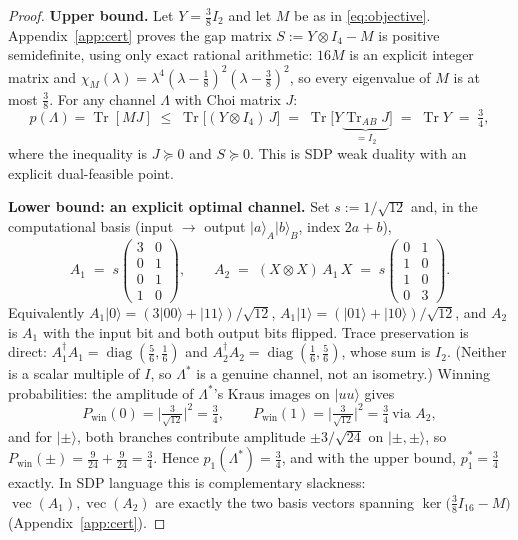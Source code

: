 \documentclass[11pt]{article}
\theoremstyle{definition}
\newcommand{\tr}{\operatorname{Tr}}
\begin{document}
\begin{proof}
\textbf{Upper bound.}  Let $Y = \tfrac38 I_2$ and let $M$ be as in
\eqref{eq:objective}.  Appendix~\ref{app:cert} proves the gap matrix
$S := Y \otimes I_4 - M$ is positive semidefinite, using only exact rational
arithmetic: $16M$ is an explicit integer matrix and $\chi_M(\lambda) =
\lambda^4 (\lambda - \tfrac18)^2 (\lambda - \tfrac38)^2$, so every eigenvalue of
$M$ is at most $\tfrac38$.  For any channel $\Lambda$ with Choi matrix $J$:
\[
  p(\Lambda) = \tr[MJ] \;\le\; \tr\big[(Y \otimes I_4)\, J\big]
  \;=\; \tr\big[Y \underbrace{\tr_{AB} J}_{= I_2}\big] \;=\; \tr Y \;=\; \tfrac34 ,
\]
where the inequality is $J \succeq 0$ and $S \succeq 0$.  This is SDP weak
duality with an explicit dual-feasible point.

\textbf{Lower bound: an explicit optimal channel.}  Set $s := 1/\sqrt{12}$ and,
in the computational basis (input $\to$ output $\lvert a\rangle_A\lvert b\rangle_B$,
index $2a + b$),
\[
A_1 \;=\; s \begin{pmatrix} 3&0\\ 0&1\\ 0&1\\ 1&0\end{pmatrix},
\qquad
A_2 \;=\; (X \otimes X)\, A_1\, X \;=\; s \begin{pmatrix} 0&1\\ 1&0\\ 1&0\\ 0&3
\end{pmatrix}.
\]
Equivalently $A_1\lvert 0\rangle = (3\lvert 00\rangle + \lvert 11\rangle)/
\sqrt{12}$, $A_1\lvert 1\rangle = (\lvert 01\rangle + \lvert 10\rangle)/
\sqrt{12}$, and $A_2$ is $A_1$ with the input bit and both output bits flipped.  Trace preservation is direct:
$A_1^\dagger A_1 = \operatorname{diag}(\tfrac56, \tfrac16)$ and $A_2^\dagger
A_2 = \operatorname{diag}(\tfrac16, \tfrac56)$, whose sum is $I_2$.  (Neither is
a scalar multiple of $I$, so $\Lambda^\ast$ is a genuine channel, not an
isometry.)  Winning probabilities: the amplitude of $\Lambda^\ast$'s Kraus
images on $\lvert uu\rangle$ gives
\[
P_{\mathrm{win}}(0) = \Big|\tfrac{3}{\sqrt{12}}\Big|^2 = \tfrac34, \qquad
P_{\mathrm{win}}(1) = \Big|\tfrac{3}{\sqrt{12}}\Big|^2 = \tfrac34 \ \text{via } A_2,
\]
and for $\lvert\pm\rangle$, both branches contribute amplitude
$\pm 3/\sqrt{24}$ on $\lvert \pm,\pm\rangle$, so $P_{\mathrm{win}}(\pm) =
\tfrac{9}{24} + \tfrac{9}{24} = \tfrac34$.  Hence $p_1(\Lambda^\ast) = \tfrac34$,
and with the upper bound, $p_1^\ast = \tfrac34$ exactly.  In SDP language this
is complementary slackness: $\operatorname{vec}(A_1), \operatorname{vec}(A_2)$
are exactly the two basis vectors spanning $\ker\big(\tfrac38 I_{16} - M\big)$
(Appendix~\ref{app:cert}).


\end{proof}
\end{document}
